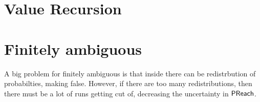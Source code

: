 %
\section{Value Recursion}
%
\section{Finitely ambiguous}
%
A big problem for finitely ambiguous is that inside  there can be redistrbution of probabilties,
making  false.
However, if there are too many redistributions, then there must be a lot of runs getting cut of,
decreasing the uncertainty in $\mathsf{PReach}{}$. 
%
